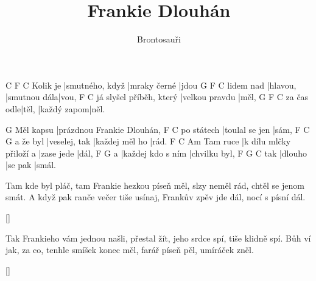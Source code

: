 \documentclass{song}
\title{Frankie Dlouhán}
\author{Brontosauři}
\begin{document}
\strophe
         C               F            C
Kolik je |smutného, když |mraky černé |jdou
          G        F            C
lidem nad |hlavou, |smutnou dála|vou,
                        F              C
já slyšel příběh, který |velkou pravdu |měl,
           G     F           C
za čas odle|těl, |každý zapom|něl.
\endstrophe

          G
Měl kapsu |prázdnou Frankie Dlouhán,
           F              C
po státech |toulal se jen |sám,
         F             C              G
a že byl |veselej, tak |každej měl ho |rád.
         F                       C          Am
Tam ruce |k dílu mlčky přiloží a |zase jede |dál,
  F                 G
a |každej kdo s ním |chvilku byl,
    F       G       C
tak |dlouho |se pak |smál.
\endstrophe

\strophe*
Tam kde byl pláč, tam Frankie hezkou píseň měl,
slzy neměl rád, chtěl se jenom smát.
A když pak ranče večer tiše usínaj,
Frankův zpěv jde dál, nocí s písní dál.
\endstrophe

\ref{}

\strophe*
Tak Frankieho vám jednou našli, přestal žít,
jeho srdce spí, tiše klidně spí.
Bůh ví jak, za co, tenhle smíšek konec měl,
farář píseň pěl, umíráček zněl.
\endstrophe

\ref{}
\end{document}
